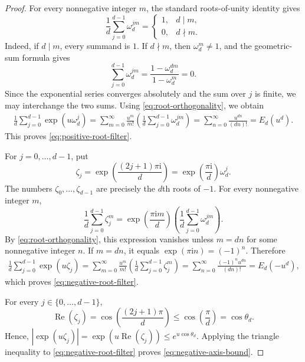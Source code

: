 \documentclass[twoside,12pt]{article}
\theoremstyle{definition}
\theoremstyle{remark}
\newcommand{\1}{\mathbf 1}
\begin{document}
\begin{proof}
For every nonnegative integer $m$, the standard roots-of-unity identity gives
\begin{equation}\label{eq:root-orthogonality}
 \frac1d\sum_{j=0}^{d-1}\omega_d^{jm}
 =
 \begin{cases}
  1,&d\mid m,\\
  0,&d\nmid m.
 \end{cases}
\end{equation}
Indeed, if $d\mid m$, every summand is $1$. If $d\nmid m$, then
$\omega_d^m\ne1$, and the geometric-sum formula gives
\[
 \sum_{j=0}^{d-1}\omega_d^{jm}
 =\frac{1-\omega_d^{dm}}{1-\omega_d^m}=0.
\]
Since the exponential series converges absolutely and the sum over $j$ is
finite, we may interchange the two sums. Using
\eqref{eq:root-orthogonality}, we obtain
\begin{align*}
 \frac1d\sum_{j=0}^{d-1}\exp(u\omega_d^j)
=\sum_{m=0}^{\infty}\frac{u^m}{m!}
 \left(\frac1d\sum_{j=0}^{d-1}\omega_d^{jm}\right)=\sum_{n=0}^{\infty}\frac{u^{dn}}{(dn)!}=E_d(u^d).
\end{align*}
This proves \eqref{eq:positive-root-filter}.

For $j=0,\ldots,d-1$, put
\[
 \zeta_j
 =\exp\!\left(\frac{(2j+1)\pi\mathrm i}{d}\right)
 =\exp\!\left(\frac{\pi\mathrm i}{d}\right)\omega_d^j.
\]
The numbers $\zeta_0,\ldots,\zeta_{d-1}$ are precisely the $d$th roots of
$-1$. For every nonnegative integer $m$,
\[
 \frac1d\sum_{j=0}^{d-1}\zeta_j^m
 =\exp\!\left(\frac{\pi\mathrm i m}{d}\right)
 \left(\frac1d\sum_{j=0}^{d-1}\omega_d^{jm}\right).
\]
By \eqref{eq:root-orthogonality}, this expression vanishes unless $m=dn$
for some nonnegative integer $n$. If $m=dn$, it equals
$\exp(\pi\mathrm i n)=(-1)^n$. Therefore
\begin{align*}
 \frac1d\sum_{j=0}^{d-1}\exp(u\zeta_j)
=\sum_{m=0}^{\infty}\frac{u^m}{m!}
 \left(\frac1d\sum_{j=0}^{d-1}\zeta_j^m\right)=\sum_{n=0}^{\infty}\frac{(-1)^nu^{dn}}{(dn)!}=E_d(-u^d),
\end{align*}
which proves \eqref{eq:negative-root-filter}.

For every $j\in\{0,\ldots,d-1\}$,
\[
 \operatorname{Re}(\zeta_j)
 =\cos\!\left(\frac{(2j+1)\pi}{d}\right)
 \le\cos\!\left(\frac\pi d\right)=\cos\theta_d.
\]
Hence,
$
 |\exp(u\zeta_j)|
=\exp\!\left(u\operatorname{Re}(\zeta_j)\right)
 \le e^{u\cos\theta_d}.
$
Applying the triangle inequality to \eqref{eq:negative-root-filter} proves
\eqref{eq:negative-axis-bound}.


\end{proof}
\end{document}
